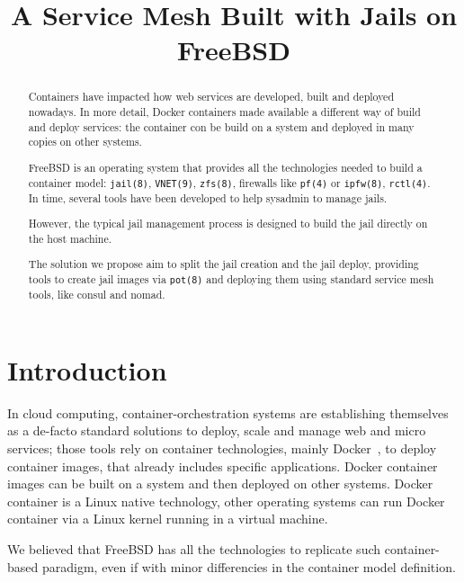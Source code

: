 \documentclass[conference,a4paper,11pt]{IEEEtran}
\begin{document}
\title{A Service Mesh Built with Jails on FreeBSD}

\author{
\and
{}
}

\maketitle

\begin{abstract}
Containers have impacted how web services are developed, built and deployed nowadays. In more detail, Docker containers made available a different way of build and deploy services: the container con be build on a system and deployed in many copies on other systems.

FreeBSD is an operating system that provides all the technologies needed to build a container model: \texttt{jail(8)}, \texttt{VNET(9)}, \texttt{zfs(8)}, firewalls like \texttt{pf(4)} or \texttt{ipfw(8)}, \texttt{rctl(4)}. In time, several tools have been developed to help sysadmin to manage jails.

However, the typical jail management process is designed to build the jail directly on the host machine.

The solution we propose aim to split the jail creation and the jail deploy, providing tools to create jail images via \texttt{pot(8)} and deploying them using standard service mesh tools, like consul and nomad.
\end{abstract}

\section{Introduction}\label{sec:Introduction}
In cloud computing, container-orchestration systems are establishing themselves as a de-facto standard solutions to deploy, scale and manage web and micro services; those tools rely on container technologies, mainly Docker~\cite{docker}, to deploy container images, that already includes specific applications. Docker container images can be built on a system and then deployed on other systems. Docker container is a Linux native technology, other operating systems can run Docker container via a Linux kernel running in a virtual machine.

We believed that FreeBSD has all the technologies to replicate such container-based paradigm, even if with minor differencies in the container model definition.
\end{document}
